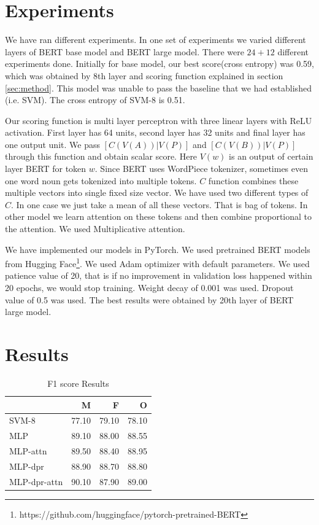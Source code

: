 \documentclass[11pt,a4paper]{article}
\begin{document}
\section{Experiments}
\label{sec:experiments}

We have ran different experiments. In one set of experiments we varied different layers of BERT base model and BERT large model. There were $24 + 12$ different experiments done. Initially for base model, our best score(cross entropy) was 0.59, which was obtained by 8th layer and scoring function explained in section \ref{sec:method}. This model was unable to pass the baseline that we had established (i.e. SVM). The cross entropy of SVM-8 is 0.51.

Our scoring function is multi layer perceptron with three linear layers with ReLU activation. First layer has 64 units, second layer has 32 units and final layer has one output unit. We pass $[C(V(A))|V(P)]$ and $[C(V(B))|V(P)]$ through this function and obtain scalar score. Here $V(w)$ is an output of certain layer BERT for token $w$. Since BERT uses WordPiece tokenizer, sometimes even one word noun gets tokenized into multiple tokens. $C$ function combines these multiple vectors into single fixed size vector. We have used two different types of $C$. In one case we just take a mean of all these vectors. That is bag of tokens. In other model we learn attention on these tokens and then combine proportional to the attention. We used Multiplicative attention.

We have implemented our models in PyTorch. We used pretrained BERT models from Hugging Face\footnote{https://github.com/huggingface/pytorch-pretrained-BERT}. We used Adam optimizer with default parameters. We used patience value of 20, that is if no improvement in validation loss happened within 20 epochs, we would stop training. Weight decay of 0.001 was used. Dropout value of 0.5 was used. The best results were obtained by 20th layer of BERT large model.

\section{Results}
\label{sec:results}

\begin{table}
  \centering
  \begin{tabular}{|l|r|r|r|}
    \hline
    & M & F & O \\
    \hline
    SVM-8 & 77.10 & 79.10 & 78.10 \\
    \hline
    MLP             & 89.10 &88.00 & 88.55 \\
    MLP-attn         &  89.50 & 88.40 & 88.95 \\
    MLP-dpr           & 88.90 & 88.70 & 88.80 \\
    MLP-dpr-attn    & 90.10 & 87.90 & 89.00 \\
    \hline
  \end{tabular}
  \caption{F1 score Results}
  \label{tab:accuracy}
\end{table}
\end{document}
